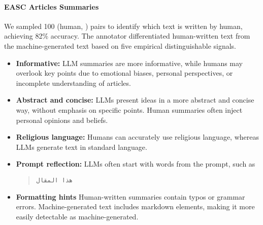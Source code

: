 

\paragraph{EASC Articles Summaries}

We sampled 100 (human, \gptfouro) pairs to identify which text is written by human, achieving 82\% accuracy.
The annotator differentiated human-written text from the machine-generated text based on five empirical distinguishable signals.
\begin{itemize}
    \item \textbf{Informative:} LLM summaries are more informative, while humans may overlook key points due to emotional biases, personal perspectives, or incomplete understanding of articles.
    \item \textbf{Abstract and concise:} LLMs present ideas in a more abstract and concise way, without emphasis on specific points. Human summaries often inject personal opinions and beliefs.
    \item \textbf{Religious language:} Humans can accurately use religious language, whereas LLMs generate text in standard language.
    \item \textbf{Prompt reflection:} LLMs often start with words from the prompt, such as
    \begin{quote}
    \small
    \begin{RLtext}
            \texttt{هذا المقال}
    \end{RLtext}
    \end{quote}
    \item \textbf{Formatting hints} Human-written summaries contain typos or grammar errors. Machine-generated text includes markdown elements, making it more easily detectable as machine-generated.
\end{itemize}

